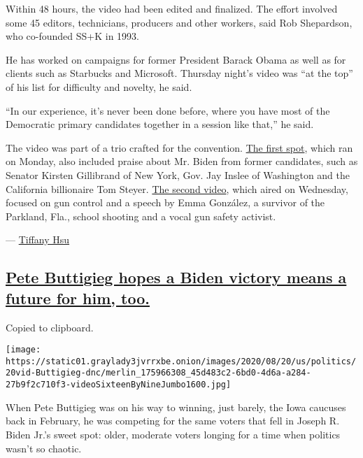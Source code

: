 Within 48 hours, the video had been edited and finalized. The effort
involved some 45 editors, technicians, producers and other workers, said
Rob Shepardson, who co-founded SS+K in 1993.

He has worked on campaigns for former President Barack Obama as well as
for clients such as Starbucks and Microsoft. Thursday night's video was
``at the top'' of his list for difficulty and novelty, he said.

``In our experience, it's never been done before, where you have most of
the Democratic primary candidates together in a session like that,'' he
said.

The video was part of a trio crafted for the convention.
\href{https://www.demconvention.com/press-releases/convention-video-united-we-stand-shows-2020-democratic-candidates-coming-together-to-defeat-donald-trump/}{The
first spot}, which ran on Monday, also included praise about Mr. Biden
from former candidates, such as Senator Kirsten Gillibrand of New York,
Gov. Jay Inslee of Washington and the California billionaire Tom Steyer.
\href{https://www.nytimes3xbfgragh.onion/live/2020/08/19/us/dnc-convention-election\#emma-gonzalez-narrated-a-video-as-the-convention-highlighted-gun-violence}{The
second video}, which aired on Wednesday, focused on gun control and a
speech by Emma González, a survivor of the Parkland, Fla., school
shooting and a vocal gun safety activist.

--- \href{https://www.nytimes3xbfgragh.onion/by/tiffany-hsu}{Tiffany
Hsu}

\hypertarget{pete-buttigieg-hopes-a-biden-victory-means-a-future-for-him-too}{%
\subsection{\texorpdfstring{\protect\hyperlink{pete-buttigieg-hopes-a-biden-victory-means-a-future-for-him-too}{Pete
Buttigieg hopes a Biden victory means a future for him,
too.}}{Pete Buttigieg hopes a Biden victory means a future for him, too.}}\label{pete-buttigieg-hopes-a-biden-victory-means-a-future-for-him-too}}

Copied to clipboard.

\texttt{[image: https://static01.graylady3jvrrxbe.onion/images/2020/08/20/us/politics/20vid-Buttigieg-dnc/merlin\_175966308\_45d483c2-6bd0-4d6a-a284-27b9f2c710f3-videoSixteenByNineJumbo1600.jpg]}

When Pete Buttigieg was on his way to winning, just barely, the Iowa
caucuses back in February, he was competing for the same voters that
fell in Joseph R. Biden Jr.'s sweet spot: older, moderate voters longing
for a time when politics wasn't so chaotic.

